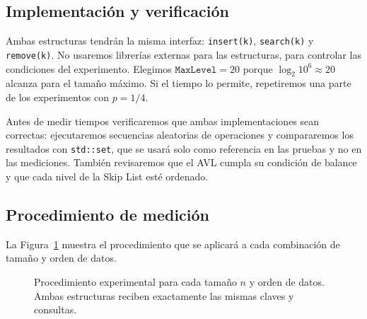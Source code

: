 \documentclass[11pt,a4paper]{article}
\begin{document}
\subsection{Implementación y verificación}

Ambas estructuras tendrán la misma interfaz: \texttt{insert(k)},
\texttt{search(k)} y \texttt{remove(k)}. No usaremos librerías externas para
las estructuras, para controlar las condiciones del experimento. Elegimos
$\texttt{MaxLevel} = 20$ porque $\log_2 10^6 \approx 20$ alcanza para el
tamaño máximo. Si el tiempo lo permite, repetiremos una parte de los
experimentos con $p = 1/4$.

Antes de medir tiempos verificaremos que ambas implementaciones sean correctas:
ejecutaremos secuencias aleatorias de operaciones y compararemos los resultados
con \texttt{std::set}, que se usará solo como referencia en las pruebas y no en
las mediciones. También revisaremos que el AVL cumpla su condición de balance y
que cada nivel de la Skip List esté ordenado.

\subsection{Procedimiento de medición}

La Figura~\ref{fig:pipeline} muestra el procedimiento que se aplicará a cada
combinación de tamaño y orden de datos.

\begin{figure}[!htb]
\centering
{}
\caption{Procedimiento experimental para cada tamaño $n$ y orden de datos.
Ambas estructuras reciben exactamente las mismas claves y consultas.}
\label{fig:pipeline}
\end{figure}
\end{document}
